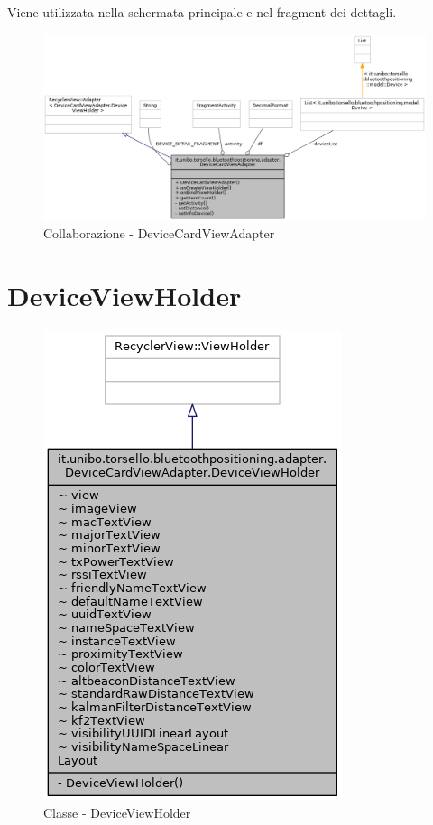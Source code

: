 Viene utilizzata nella schermata principale e nel fragment dei dettagli.

\begin{figure}[ph]
	\centering
	\includegraphics[width=1.5\linewidth,angle=90]{img/uml/class/classit_1_1unibo_1_1torsello_1_1bluetoothpositioning_1_1adapter_1_1DeviceCardViewAdapter__coll__graph.png}
	\caption{Collaborazione - DeviceCardViewAdapter}
\end{figure}

\newpage
\section{DeviceViewHolder}
\begin{figure}[ph]
	\centering
	\includegraphics[width=0.5\linewidth]{img/uml/class/classit_1_1unibo_1_1torsello_1_1bluetoothpositioning_1_1adapter_1_1DeviceCardViewAdapter_1_1DeviceViewHolder__inherit__graph.png}
	\caption{Classe - DeviceViewHolder}
\end{figure}

